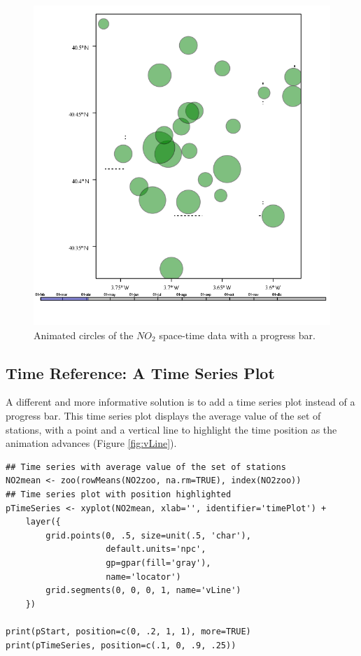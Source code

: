 \documentclass[smallroyalvopaper]{memoir}
\begin{document}
\begin{figure}
  \centering
  \includegraphics[width=\textwidth]{figs/NO2pb.png}
  \caption{Animated circles of the $NO_2$ space-time data with a progress bar.}
  \label{fig:NO2pb}
\end{figure}
\subsection{Time Reference: A Time Series Plot}
\label{sec-4-4}
A different and more informative solution is to add a time series
plot instead of a progress bar.  This time series plot displays
the average value of the set of stations, with a point and a
vertical line to highlight the time position as the animation
advances (Figure \ref{fig:vLine}).
\lstset{language=R,numbers=none}
\begin{lstlisting}
## Time series with average value of the set of stations
NO2mean <- zoo(rowMeans(NO2zoo, na.rm=TRUE), index(NO2zoo))
## Time series plot with position highlighted
pTimeSeries <- xyplot(NO2mean, xlab='', identifier='timePlot') +
    layer({
        grid.points(0, .5, size=unit(.5, 'char'),
                    default.units='npc',
                    gp=gpar(fill='gray'),
                    name='locator')
        grid.segments(0, 0, 0, 1, name='vLine')
    })

print(pStart, position=c(0, .2, 1, 1), more=TRUE)
print(pTimeSeries, position=c(.1, 0, .9, .25))
\end{lstlisting}
\end{document}

